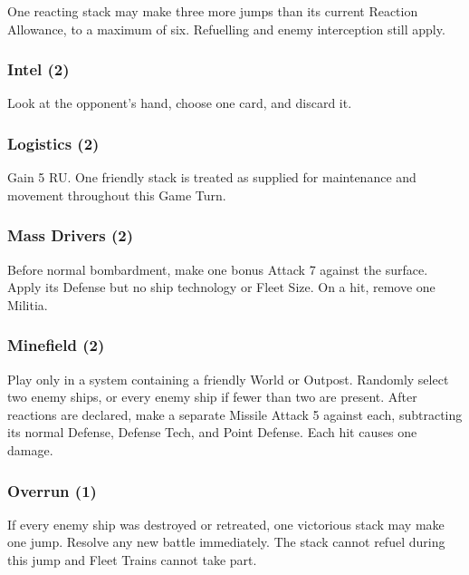  One reacting stack may make three more jumps
than its current Reaction Allowance, to a maximum of six. Refuelling and enemy
interception still apply.

\subsubsection{Intel (2)}

 Look at the opponent's hand, choose one card,
and discard it.

\subsubsection{Logistics (2)}

 Gain 5 RU. One friendly stack is
treated as supplied for maintenance and movement throughout this Game Turn.

\subsubsection{Mass Drivers (2)}

 Before normal bombardment, make one bonus Attack 7
against the surface. Apply its Defense but no ship technology or Fleet Size.
On a hit, remove one Militia.

\subsubsection{Minefield (2)}

 Play only in a system
containing a friendly World or Outpost. Randomly select two enemy ships, or
every enemy ship if fewer than two are present. After reactions are declared,
make a separate Missile Attack 5 against each, subtracting its normal Defense,
Defense Tech, and Point Defense. Each hit causes one damage.

\subsubsection{Overrun (1)}

 If every enemy ship was destroyed
or retreated, one victorious stack may make one jump. Resolve any new battle
immediately. The stack cannot refuel during this jump and Fleet Trains cannot
take part.

